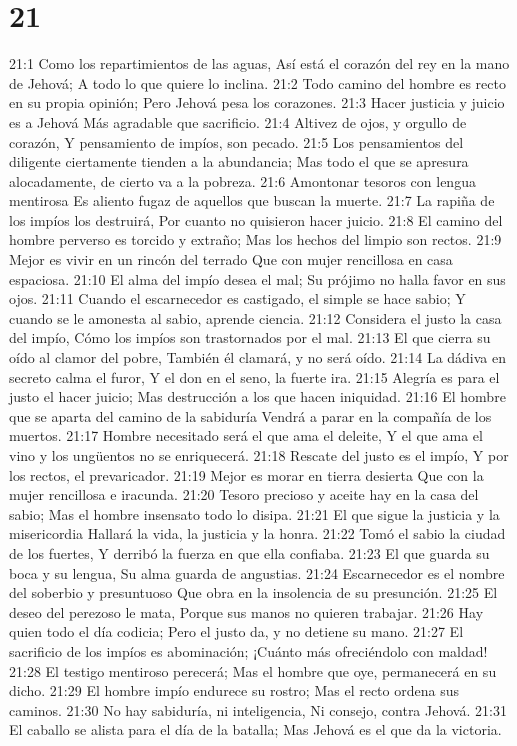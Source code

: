 \chapter{21}


21:1 Como los repartimientos de las aguas,  
Así está el corazón del rey en la mano de Jehová;  
A todo lo que quiere lo inclina.  
21:2 Todo camino del hombre es recto en su propia opinión;  
Pero Jehová pesa los corazones.  
21:3 Hacer justicia y juicio es a Jehová  
Más agradable que sacrificio.  
21:4 Altivez de ojos, y orgullo de corazón,  
Y pensamiento de impíos, son pecado.  
21:5 Los pensamientos del diligente ciertamente tienden a la abundancia;  
Mas todo el que se apresura alocadamente, de cierto va a la pobreza.  
21:6 Amontonar tesoros con lengua mentirosa  
Es aliento fugaz de aquellos que buscan la muerte.  
21:7 La rapiña de los impíos los destruirá, 
Por cuanto no quisieron hacer juicio.  
21:8 El camino del hombre perverso es torcido y extraño;  
Mas los hechos del limpio son rectos.  
21:9 Mejor es vivir en un rincón del terrado  
Que con mujer rencillosa en casa espaciosa.  
21:10 El alma del impío desea el mal;  
Su prójimo no halla favor en sus ojos.  
21:11 Cuando el escarnecedor es castigado, el simple se hace sabio;  
Y cuando se le amonesta al sabio, aprende ciencia.  
21:12 Considera el justo la casa del impío,  
Cómo los impíos son trastornados por el mal.  
21:13 El que cierra su oído al clamor del pobre,  
También él clamará, y no será oído.  
21:14  La dádiva en secreto calma el furor,  
Y el don en el seno, la fuerte ira.  
21:15 Alegría es para el justo el hacer juicio;  
Mas destrucción a los que hacen iniquidad.  
21:16 El hombre que se aparta del camino de la sabiduría  
Vendrá a parar en la compañía de los muertos.  
21:17 Hombre necesitado será el que ama el deleite,  
Y el que ama el vino y los ungüentos no se enriquecerá. 
21:18 Rescate del justo es el impío,  
Y por los rectos, el prevaricador.  
21:19 Mejor es morar en tierra desierta  
Que con la mujer rencillosa e iracunda.  
21:20 Tesoro precioso y aceite hay en la casa del sabio;  
Mas el hombre insensato todo lo disipa.  
21:21 El que sigue la justicia y la misericordia  
Hallará la vida, la justicia y la honra.  
21:22 Tomó el sabio la ciudad de los fuertes,  
Y derribó la fuerza en que ella confiaba.  
21:23 El que guarda su boca y su lengua,  
Su alma guarda de angustias.  
21:24 Escarnecedor es el nombre del soberbio y presuntuoso  
Que obra en la insolencia de su presunción. 
21:25 El deseo del perezoso le mata,  
Porque sus manos no quieren trabajar.  
21:26 Hay quien todo el día codicia;  
Pero el justo da, y no detiene su mano.  
21:27 El sacrificio de los impíos es abominación;  
¡Cuánto más ofreciéndolo con maldad!  
21:28 El testigo mentiroso perecerá;  
Mas el hombre que oye, permanecerá en su dicho.  
21:29 El hombre impío endurece su rostro;  
Mas el recto ordena sus caminos.  
21:30 No hay sabiduría, ni inteligencia,  
Ni consejo, contra Jehová.  
21:31 El caballo se alista para el día de la batalla;  
Mas Jehová es el que da la victoria.  

